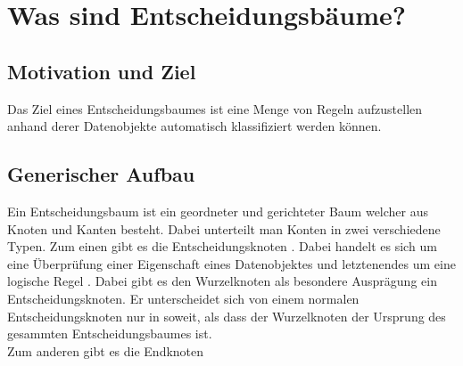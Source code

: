 \chapter{Was sind Entscheidungsbäume?}
\label{eb:was-sind-entscheidungsbaeume}



\section{Motivation und Ziel}
\label{eb:motivation}
Das Ziel eines Entscheidungsbaumes ist eine Menge von Regeln aufzustellen anhand derer Datenobjekte automatisch klassifiziert werden können. \autocite{Entschei47:online} 

\section{Generischer Aufbau}
\label{eb:aufbau}
Ein Entscheidungsbaum ist ein geordneter und gerichteter \autocite{Entschei47:online} Baum welcher aus Knoten und Kanten besteht. Dabei unterteilt man Konten in zwei verschiedene Typen. Zum einen gibt es die Entscheidungsknoten \autocites{Decision5:online}{FramworkForSensitivity:online}. Dabei handelt es sich um eine Überprüfung einer Eigenschaft eines Datenobjektes \autocite{DataMining} und letztenendes um eine logische Regel \autocite{Entschei47:online}. Dabei gibt es den Wurzelknoten als besondere Ausprägung ein Entscheidungsknoten. Er unterscheidet sich von einem normalen Entscheidungsknoten nur in soweit, als dass der Wurzelknoten der Ursprung des gesammten Entscheidungsbaumes ist.\\
Zum anderen gibt es die Endknoten
